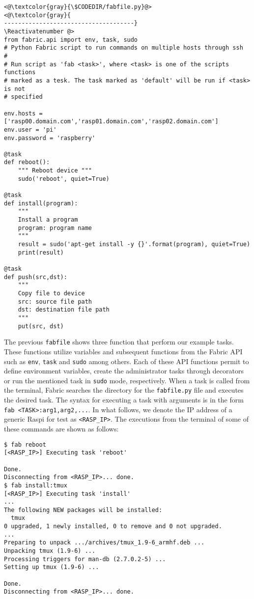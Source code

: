 \Suppressnumber\begin{lstlisting}[]
<@\textcolor{gray}{\$CODEDIR/fabfile.py}@>
<@\textcolor{gray}{
-------------------------------------}
\Reactivatenumber @>
from fabric.api import env, task, sudo
# Python Fabric script to run commands on multiple hosts through ssh
#
# Run script as 'fab <task>', where <task> is one of the scripts functions
# marked as a tesk. The task marked as 'default' will be run if <task> is not
# specified

env.hosts = ['rasp00.domain.com','rasp01.domain.com','rasp02.domain.com']
env.user = 'pi'
env.password = 'raspberry'

@task
def reboot():
    """ Reboot device """
    sudo('reboot', quiet=True)

@task
def install(program):
    """
    Install a program
    program: program name
    """
    result = sudo('apt-get install -y {}'.format(program), quiet=True)
    print(result)

@task
def push(src,dst):
    """
    Copy file to device
    src: source file path
    dst: destination file path
    """
    put(src, dst)

\end{lstlisting}
\FloatBarrier

The previous \texttt{fabfile} shows three function that perform our
example tasks. These functions utilize variables and subsequent functions
from the Fabric \ac{API} such as \texttt{env}, \texttt{task} and \texttt{sudo}
among others. Each of these \ac{API} functions permit to define environment
variables, create the administrator tasks through decorators or run the
mentioned task in \texttt{sudo} mode, respectively.
When a task is called from the terminal, Fabric searches the directory for
the \texttt{fabfile.py} file and executes the desired task. The syntax for
executing a task with arguments is in the form
\texttt{fab <TASK>:arg1,arg2,...}. In what follows, we denote the
\ac{IP} address of a generic \ac{Raspi} for test as \texttt{<RASP\_IP>}.
The executions from the terminal of some of these commands are shown as
follows:

\begin{lstlisting}[]
$ fab reboot
[<RASP_IP>] Executing task 'reboot'

Done.
Disconnecting from <RASP_IP>... done.
$ fab install:tmux
[<RASP_IP>] Executing task 'install'
...
The following NEW packages will be installed:
  tmux
0 upgraded, 1 newly installed, 0 to remove and 0 not upgraded.
...
Preparing to unpack .../archives/tmux_1.9-6_armhf.deb ...
Unpacking tmux (1.9-6) ...
Processing triggers for man-db (2.7.0.2-5) ...
Setting up tmux (1.9-6) ...

Done.
Disconnecting from <RASP_IP>... done.
\end{lstlisting}
\FloatBarrier
\vspace{-5mm}

